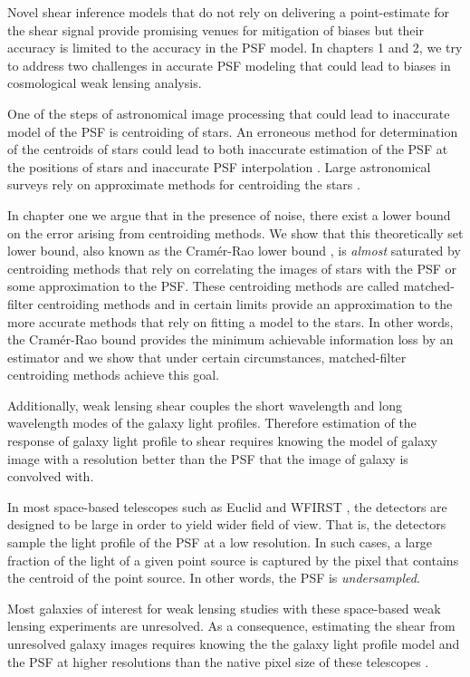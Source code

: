 Novel shear inference models that do not rely on delivering a point-estimate for the shear signal \citep{schneider,bernstein,huff,sheldon} 
provide promising venues for mitigation of biases but their accuracy is limited to the accuracy in the PSF model.
In chapters 1 and 2, we try to address two challenges in accurate PSF modeling that could lead to biases in cosmological weak lensing analysis. 

One of the steps of astronomical image processing that could lead to inaccurate model of the PSF is centroiding 
of stars. An erroneous method for determination of the centroids of stars could lead to both inaccurate estimation of the 
PSF at the positions of stars and inaccurate PSF interpolation \citep{anderson2000,sdss,anderson2003,desc}. Large astronomical surveys rely on approximate 
methods for centroiding the stars \citep{sextractor,sdss,des}. 

In chapter one we argue that in the presence of noise, there exist
a lower bound on the error arising from centroiding methods. We show that this theoretically set lower bound, also known as the Cram\'{e}r-Rao lower bound \citep{lecam}, 
is \emph{almost} saturated by centroiding methods that rely on correlating the images of stars with the PSF or some approximation to the 
PSF. These centroiding methods are called matched-filter centroiding methods and in certain limits provide an approximation to the more accurate 
methods that rely on fitting a model to the stars. In other words, the Cram\'{e}r-Rao bound provides the minimum achievable information loss by an estimator and 
we show that under certain circumstances, matched-filter centroiding methods achieve this goal.

Additionally, weak lensing shear couples the short wavelength and long wavelength modes of the galaxy light profiles. 
Therefore estimation of the response of galaxy light profile to shear requires knowing the model of galaxy image 
with a resolution better than the PSF that the image of galaxy is convolved with. 

In most space-based telescopes such as Euclid \citep{euclid} and WFIRST \citep{wfirst}, the detectors are designed to be large in order to yield wider field of view. 
That is, the detectors sample the light profile of the PSF at a low resolution. In such cases, a large fraction of the light of a given point source 
is captured by the pixel that contains the centroid of the point source. In other words, the PSF is \emph{undersampled}.

Most galaxies of interest for weak lensing studies with these space-based weak lensing experiments are unresolved. 
As a consequence, estimating the shear from unresolved galaxy images requires 
knowing the the galaxy light profile model and the PSF at higher resolutions than the native pixel size of these telescopes \citep{olic,ngole2}.

